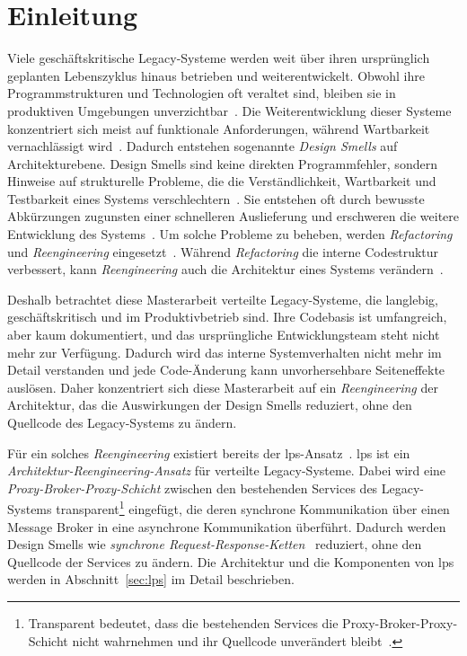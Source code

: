 \chapter{Einleitung}
\label{ch:einleitung}

Viele geschäftskritische Legacy-Systeme werden weit über ihren ursprünglich geplanten Lebenszyklus hinaus betrieben und weiterentwickelt. Obwohl ihre Programmstrukturen und Technologien oft veraltet sind, bleiben sie in produktiven Umgebungen unverzichtbar~\citep{363157}. Die Weiterentwicklung dieser Systeme konzentriert sich meist auf funktionale Anforderungen, während Wartbarkeit vernachlässigt wird~\citep{refactoring_for_software_architecture_smells}. Dadurch entstehen sogenannte \textit{Design Smells} auf Architekturebene. Design Smells sind keine direkten Programmfehler, sondern Hinweise auf strukturelle Probleme, die die Verständlichkeit, Wartbarkeit und Testbarkeit eines Systems verschlechtern~\citep{software_design_smell_detection}. Sie entstehen oft durch bewusste Abkürzungen zugunsten einer schnelleren Auslieferung und erschweren die weitere Entwicklung des Systems~\citep{sharma2020}. Um solche Probleme zu beheben, werden \textit{Refactoring} und \textit{Reengineering} eingesetzt~\citep{laguna_systematic_2013, majthoub_software_2018}. Während \textit{Refactoring} die interne Codestruktur verbessert, kann \textit{Reengineering} auch die Architektur eines Systems verändern~\citep{laguna_systematic_2013}.

Deshalb betrachtet diese Masterarbeit verteilte Legacy-Systeme, die langlebig, geschäftskritisch und im Produktivbetrieb sind. Ihre Codebasis ist umfangreich, aber kaum dokumentiert, und das ursprüngliche Entwicklungsteam steht nicht mehr zur Ver\-fü\-gung. Dadurch wird das interne Systemverhalten nicht mehr im Detail verstanden und jede Code-Änderung kann unvorhersehbare Seiteneffekte auslösen. Daher konzentriert sich diese Masterarbeit auf ein \textit{Reengineering} der Architektur, das die Auswirkungen der Design Smells reduziert, ohne den Quellcode des Legacy-Systems zu ändern.

Für ein solches \textit{Reengineering} existiert bereits der \gls{lps}-Ansatz~\citep{liebig_2025_architectural_refactoring}. \gls{lps} ist ein \textit{Architektur-Reengineering-Ansatz} für verteilte Legacy-Systeme. Dabei wird eine \textit{Proxy-Broker-Proxy-Schicht} zwischen den bestehenden Services des Legacy-Systems transparent\footnote{Transparent bedeutet, dass die bestehenden Services die Proxy-Broker-Proxy-Schicht nicht wahrnehmen und ihr Quellcode unverändert bleibt~\citep{vansteen2023distributed}.} eingefügt, die deren synchrone Kommunikation über einen Message Broker in eine asynchrone Kommunikation überführt. Dadurch werden Design Smells wie \textit{synchrone Request-Response-Ketten}~\citep{tiwari_unveiling_2024, liebig_2025_architectural_refactoring} reduziert, ohne den Quellcode der Services zu ändern. Die Architektur und die Komponenten von \gls{lps} werden in Abschnitt~\ref{sec:lps} im Detail beschrieben.

